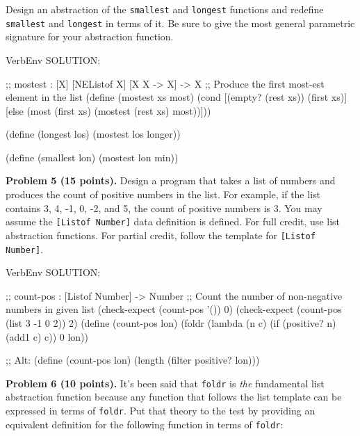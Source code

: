 \documentclass[12pt]{article}
\begin{document}
Design an abstraction of the {\tt smallest} and {\tt longest}
functions and redefine {\tt smallest} and {\tt longest} in terms of
it.  Be sure to give the most general parametric signature for your
abstraction function.


\newpage


\begin{SaveVerbatim}{VerbEnv}
SOLUTION:

;; mostest : [X] [NEListof X] [X X -> X] -> X
;; Produce the first most-est element in the list
(define (mostest xs most)
  (cond [(empty? (rest xs)) (first xs)]
        [else
          (most (first xs)
                (mostest (rest xs) most))]))

(define (longest los)
  (mostest los longer))

(define (smallest lon)
  (mostest lon min))
\end{SaveVerbatim}




\newpage
\noindent
{\bf Problem 5 (15 points).}  
%
Design a program that takes a list of numbers and produces the count
of positive numbers in the list.  For example, if the list contains 3,
4, -1, 0, -2, and 5, the count of positive numbers is 3.  You may
assume the {\tt{[Listof Number]}} data definition is defined.
%
For full credit, use list abstraction functions.  For partial credit,
follow the template for {\tt{[Listof Number]}}.


\begin{SaveVerbatim}{VerbEnv}
SOLUTION:

;; count-pos : [Listof Number] -> Number
;; Count the number of non-negative numbers in given list
(check-expect (count-pos '()) 0)
(check-expect (count-pos (list 3 -1 0 2)) 2)
(define (count-pos lon)
  (foldr (lambda (n c) (if (positive? n) (add1 c) c)) 0 lon))

;; Alt:
(define (count-pos lon)
  (length (filter positive? lon)))
\end{SaveVerbatim}




\newpage

\noindent
{\bf Problem 6 (10 points).}
%
It's been said that {\tt foldr} is \emph{the} fundamental list
abstraction function because any function that follows the list
template can be expressed in terms of {\tt foldr}.  Put that theory to
the test by providing an equivalent definition for the following
function in terms of {\tt foldr}:
\end{document}
